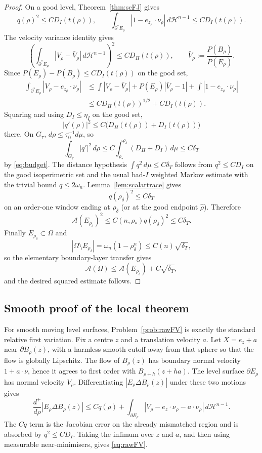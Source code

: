 \documentclass[11pt]{article}
\theoremstyle{definition}
\newcommand{\Fr}{\mathcal A}
\newcommand{\HH}{\mathcal H}
\newcommand{\dT}{\delta_T}
\newcommand{\rstar}{\rho_*}
\newcommand{\rdel}{\rho_\delta}
\newcommand{\muT}{\mu}
\begin{document}
\begin{proof}
On a good level, Theorem~\ref{thm:scFJ} gives
\[
   q(\rho)^2\le C D_I(t(\rho)),
   \qquad
   \int_{\partial^*E_\rho}|1-e_{z_\rho}\cdot\nu_\rho|\,d\HH^{n-1}
   \le C D_I(t(\rho)).
\]
The velocity variance identity gives
\[
   \left(\int_{\partial^*E_\rho}|V_\rho-\bar V_\rho|\,d\HH^{n-1}\right)^2
   \le C D_H(t(\rho)),
   \qquad
   \bar V_\rho:=\frac{P(B_\rho)}{P(E_\rho)} .
\]
Since \(P(E_\rho)-P(B_\rho)\le C D_I(t(\rho))\) on the good set,
\[
\begin{aligned}
   \int_{\partial^*E_\rho}|V_\rho-e_{z_\rho}\cdot\nu_\rho|
   &\le
   \int|V_\rho-\bar V_\rho|
   +P(E_\rho)|\bar V_\rho-1|
   +\int|1-e_{z_\rho}\cdot\nu_\rho|                                      \\
   &\le C D_H(t(\rho))^{1/2}+C D_I(t(\rho)).
\end{aligned}
\]
Squaring and using \(D_I\le\eta_I\) on the good set,
\[
   |q'(\rho)|^2\le C\bigl(D_H(t(\rho))+D_I(t(\rho))\bigr)
\]
there.  On \(G_\tau\), \(d\rho\le\tau_0^{-1}d\muT\), so
\[
   \int_{G_\tau}|q'|^2\,d\rho
   \le C\int_{\rstar}^{\rdel}(D_H+D_I)\,d\muT
   \le C\dT
\]
by \eqref{eq:budget}.  The distance hypothesis
\(\int q^2\,d\muT\le C\dT\) follows from \(q^2\le C D_I\) on the good
isoperimetric set and the usual bad-\(I\) weighted Markov estimate with the
trivial bound \(q\le2\omega_n\).  Lemma~\ref{lem:scalartrace} gives
\[
   q(\rdel)^2\le C\dT
\]
on an order-one window ending at \(\rdel\) (or at the good endpoint
\(\widehat\rho\)).  Therefore
\[
   \Fr(E_{\rdel})^2
   \le C(n,\rstar)q(\rdel)^2
   \le C\dT .
\]
Finally \(E_{\rdel}\subset\Omega\) and
\[
   |\Omega\setminus E_{\rdel}|=\omega_n(1-\rdel^n)
   \le C(n)\sqrt{\dT},
\]
so the elementary boundary-layer transfer gives
\[
   \Fr(\Omega)\le \Fr(E_{\rdel})+C\sqrt{\dT},
\]
and the desired squared estimate follows.
\end{proof}

\subsection{Smooth proof of the local theorem}

For smooth moving level surfaces, Problem~\ref{prob:rawFV} is exactly the
standard relative first variation.  Fix a centre \(z\) and a translation
velocity \(a\).  Let \(X=e_z+a\) near \(\partial B_\rho(z)\), with a harmless
smooth cutoff away from that sphere so that the flow is globally Lipschitz.
The flow of \(B_\rho(z)\) has boundary normal velocity \(1+a\cdot\nu\), hence
it agrees to first order with \(B_{\rho+h}(z+ha)\).  The level surface
\(\partial E_\rho\) has normal velocity \(V_\rho\).  Differentiating
\(|E_\rho\Delta B_\rho(z)|\) under these two motions gives
\[
   \frac{d^+}{d\rho}|E_\rho\Delta B_\rho(z)|
   \le
   C q(\rho)
   +
   \int_{\partial E_\rho}
      |V_\rho-e_z\cdot\nu_\rho-a\cdot\nu_\rho|\,d\HH^{n-1}.
\]
The \(Cq\) term is the Jacobian error on the already mismatched region and is
absorbed by \(q^2\le C D_I\).  Taking the infimum over \(z\) and \(a\), and
then using measurable near-minimisers, gives \eqref{eq:rawFV}.
\end{document}
